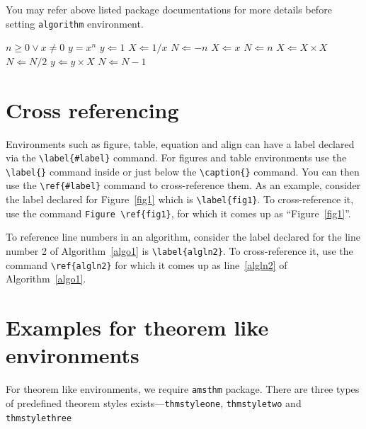 \documentclass{svproc}
\begin{document}
You may refer above listed package documentations for more details before setting \verb+algorithm+ environment.

\begin{algorithm}
\caption{Calculate $y = x^n$}\label{algo1}
\begin{algorithmic}[1]
\Require $n \geq 0 \vee x \neq 0$
\Ensure $y = x^n$ 
\State $y \Leftarrow 1$
\label{algln2}
        \State $X \Leftarrow 1 / x$
        \State $N \Leftarrow -n$
\Else
        \State $X \Leftarrow x$
        \State $N \Leftarrow n$
\EndIf
{}
            \State $X \Leftarrow X \times X$
            \State $N \Leftarrow N / 2$
        \Else[$N$ is odd]
            \State $y \Leftarrow y \times X$
            \State $N \Leftarrow N - 1$
        \EndIf
\EndWhile
\end{algorithmic}
\end{algorithm}


\section{Cross referencing}\label{sec8}

Environments such as figure, table, equation and align can have a label
declared via the \verb+\label{#label}+ command. For figures and table
environments use the \verb+\label{}+ command inside or just
below the \verb+\caption{}+ command. You can then use the
\verb+\ref{#label}+ command to cross-reference them. As an example, consider
the label declared for Figure~\ref{fig1} which is
\verb+\label{fig1}+. To cross-reference it, use the command 
\verb+Figure \ref{fig1}+, for which it comes up as
``Figure~\ref{fig1}''. 

To reference line numbers in an algorithm, consider the label declared for the line number 2 of Algorithm~\ref{algo1} is \verb+\label{algln2}+. To cross-reference it, use the command \verb+\ref{algln2}+ for which it comes up as line~\ref{algln2} of Algorithm~\ref{algo1}.

\section{Examples for theorem like environments}\label{sec10}

For theorem like environments, we require \verb+amsthm+ package. There are three types of predefined theorem styles exists---\verb+thmstyleone+, \verb+thmstyletwo+ and \verb+thmstylethree+ 
\end{document}
